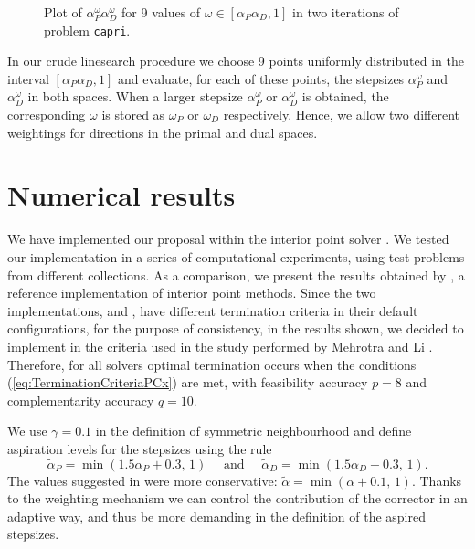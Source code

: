 \begin{figure}[ht]
\begin{minipage}[t]{0.49\textwidth}
  \end{minipage}
  \caption{Plot of $\alpha^\omega_P\alpha^\omega_D$ for 9 values 
           of $\omega \in [\alpha_P\alpha_D, 1]$
           in two iterations of problem {\tt capri}.}
  \label{fig:alphaomega}
\end{figure}

In our crude linesearch procedure we choose 9 points uniformly 
distributed in the interval $[\alpha_P\alpha_D, 1]$ 
and evaluate, for each of these points, the stepsizes 
$\alpha^\omega_P$ and $\alpha^\omega_D$ in both spaces. 
When a larger stepsize $\alpha^\omega_P$ or $\alpha^\omega_D$ is obtained, 
the corresponding $\omega$ is stored as $\omega_P$ or $\omega_D$ 
respectively. Hence, we allow two different weightings for directions 
in the primal and dual spaces.

%
%
\section{Numerical results}
\label{sec:NumericalResults}

We have implemented our proposal within the \HOPDM interior point solver 
\cite{HOPDM}. 
%
%
We tested our implementation in a series of computational 
experiments, using test problems from different collections. 
As a comparison, we present the results obtained by \PCx \cite{PCx}, 
a reference implementation of interior point methods. Since the two 
implementations, \PCx and \HOPDM, have different termination criteria 
in their default configurations, for the purpose of consistency,
in the results shown, 
we decided to implement in \HOPDM the criteria used in the study 
performed by Mehrotra and Li \cite{MehrotraLi}.
Therefore, for all solvers optimal termination occurs when the conditions
(\ref{eq:TerminationCriteriaPCx}) are met, with feasibility
accuracy $p=8$ and complementarity accuracy $q = 10$.

We use $\gamma = 0.1$ in the definition of symmetric 
neighbourhood and define aspiration levels for the stepsizes using the rule
\[
  \tilde{\alpha}_{P} = \min(1.5 \alpha_{P} \! + \! 0.3, \, 1) 
  \quad \mbox{ and } \quad
  \tilde{\alpha}_{D} = \min(1.5 \alpha_{D} \! + \! 0.3, \, 1). 
\]
The values suggested in \cite{Gondzio96} were more conservative:
$\tilde{\alpha} = \min (\alpha + 0.1, \, 1)$.
Thanks to the weighting mechanism we can control 
the contribution of the corrector in an adaptive way,
and thus be more demanding in the definition of the aspired stepsizes.

